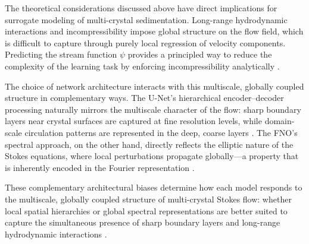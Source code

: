 The theoretical considerations discussed above have direct implications for
surrogate modeling of multi-crystal sedimentation. Long-range hydrodynamic
interactions and incompressibility impose global structure on the flow field,
which is difficult to capture through purely local regression of velocity
components. Predicting the stream function $\psi$ provides a principled way to
reduce the complexity of the learning task by enforcing incompressibility
analytically \parencite{happel_low_1983}.

The choice of network architecture interacts with this multiscale, globally
coupled structure in complementary ways. The U-Net's hierarchical encoder--decoder processing
naturally mirrors the multiscale character of the flow: sharp boundary layers
near crystal surfaces are captured at fine resolution levels, while
domain-scale circulation patterns are represented in the deep, coarse layers
\parencite{ronneberger_u-net_2015,thuerey_deep_2020}. The FNO's spectral approach, on the other hand, directly reflects the
elliptic nature of the Stokes equations, where local perturbations propagate
globally—a property that is inherently encoded in the Fourier representation
\parencite{li_fourier_2021}.

These complementary architectural biases determine how each model responds to
the multiscale, globally coupled structure of multi-crystal Stokes flow: whether
local spatial hierarchies or global spectral representations are better suited
to capture the simultaneous presence of sharp boundary layers and long-range
hydrodynamic interactions \parencite{lu_comprehensive_2022}.
